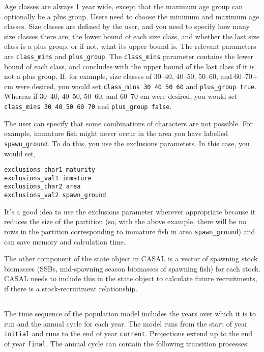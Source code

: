 Age classes are always 1 year wide, except that the maximum age group can optionally be a plus group. Users need to choose the minimum and maximum age classes. Size classes are defined by the user, and you need to specify how many size classes there are, the lower bound of each size class, and whether the last size class is a plus group, or if not, what its upper bound is. The relevant parameters are \texttt{class\_mins} and \texttt{plus\_group}. The \texttt{class\_mins} parameter contains the lower bound of each class, and concludes with the upper bound of the last class if it is not a plus group. If, for example, size classes of 30–40, 40–50, 50–60, and 60–70+ cm were desired, you would set \texttt{class\_mins 30 40 50 60} and \texttt{plus\_group true}. Whereas if 30–40, 40–50, 50–60, and 60–70 cm were desired, you would set \texttt{class\_mins 30 40 50 60 70} and \texttt{plus\_group false}.

The user can specify that some combinations of characters are not possible. For example, immature fish might never occur in the area you have labelled \texttt{spawn\_ground}. To do this, you use the exclusions parameters. In this case, you would set,

\texttt{exclusions\_char1 maturity}\\
\texttt{exclusions\_val1 immature}\\
\texttt{exclusions\_char2 area}\\
\texttt{exclusions\_val2 spawn\_ground}

It’s a good idea to use the exclusions parameter wherever appropriate because it reduces the size of the partition (so, with the above example, there will be no rows in the partition corresponding to immature fish in area \texttt{spawn\_ground}) and can save memory and calculation time.

The other component of the state object in CASAL is a vector of spawning stock biomasses (SSBs, mid-spawning season biomasses of spawning fish) for each stock. CASAL needs to include this in the state object to calculate future recruitments, if there is a stock-recruitment relationship. 

\subsection{}

The time sequence of the population model includes the years over which it is to run and the annual cycle for each year. The model runs from the start of year \texttt{initial} and runs to the end of year \texttt{current}. Projections extend up to the end of year \texttt{final}. The annual cycle can contain the following transition processes: 

